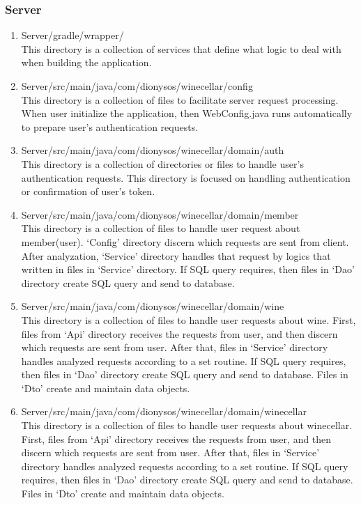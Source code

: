 \documentclass[conference]{IEEEtran}
\numberwithin{figure}{subsection}
\begin{document}
    \subsubsection{Server}
    \begin{enumerate}
        \item Server/gradle/wrapper/ \\
        This directory is a collection of services that define what logic to deal with when building the application.
        \item Server/src/main/java/com/dionysos/winecellar/config \\
        This directory is a collection of files to facilitate server request processing. When user initialize the application, then WebConfig.java runs automatically to prepare user’s authentication requests.
        \item Server/src/main/java/com/dionysos/winecellar/domain/auth\\
        This directory is a collection of directories or files to handle user’s authentication requests. This directory is focused on handling authentication or confirmation of user’s token.
        \item Server/src/main/java/com/dionysos/winecellar/domain/member\\
        This directory is a collection of files to handle user request about member(user). ‘Config’ directory discern which requests are sent from client. After analyzation, ‘Service’ directory handles that request by logics that written in files in ‘Service’ directory. If SQL query requires, then files in ‘Dao’ directory create SQL query and send to database.
        \item Server/src/main/java/com/dionysos/winecellar/domain/wine\\
        This directory is a collection of files to handle user requests about wine. First, files from ‘Api’ directory receives the requests from user, and then discern which requests are sent from user. After that, files in ‘Service’ directory handles analyzed requests according to a set routine. If SQL query requires, then files in ‘Dao’ directory create SQL query and send to database. Files in ‘Dto’ create and maintain data objects.
        \item Server/src/main/java/com/dionysos/winecellar/domain/winecellar\\
        This directory is a collection of files to handle user requests about winecellar. First, files from ‘Api’ directory receives the requests from user, and then discern which requests are sent from user. After that, files in ‘Service’ directory handles analyzed requests according to a set routine. If SQL query requires, then files in ‘Dao’ directory create SQL query and send to database. Files in ‘Dto’ create and maintain data objects.
    \end{enumerate}
\end{document}
